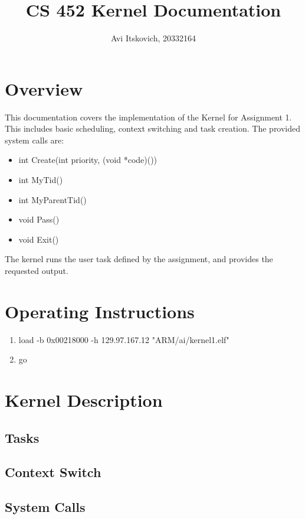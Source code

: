 \documentclass{article}
\title{CS 452 Kernel Documentation}
\author{Avi Itskovich, 20332164}
\begin{document}
\maketitle

\section{Overview}

This documentation covers the implementation of the Kernel for Assignment 1. This includes basic scheduling, context switching and task creation. The provided system calls are:
\begin{itemize}
  \item int Create(int priority, (void *code)())
  \item int MyTid()
  \item int MyParentTid()
  \item void Pass()
  \item void Exit()
\end{itemize}
The kernel runs the user task defined by the assignment, and provides the requested output.

\section{Operating Instructions}
\begin{enumerate}
  \item load -b 0x00218000 -h 129.97.167.12 "ARM/ai/kernel1.elf"
  \item go
\end{enumerate}

\section{Kernel Description}

\subsection{Tasks}

\subsection{Context Switch}

\subsection{System Calls}
\end{document}
